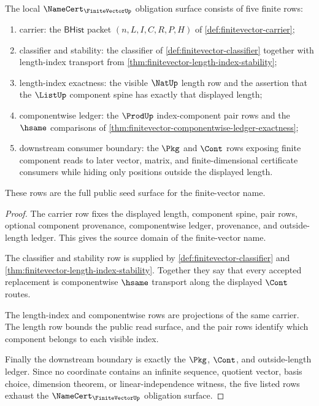 \begin{theorem}
\label{thm:finitevector-namecert-obligation-surface}
The local $\NameCert_{\FiniteVectorUp}$ obligation surface consists of five finite rows:
\begin{enumerate}
\item carrier: the $\mathsf{BHist}$ packet $(n,L,I,C,R,P,H)$ of \autoref{def:finitevector-carrier};
\item classifier and stability: the classifier of \autoref{def:finitevector-classifier} together with length-index transport from \autoref{thm:finitevector-length-index-stability};
\item length-index exactness: the visible $\NatUp$ length row and the assertion that the $\ListUp$ component spine has exactly that displayed length;
\item componentwise ledger: the $\ProdUp$ index-component pair rows and the $\hsame$ comparisons of \autoref{thm:finitevector-componentwise-ledger-exactness};
\item downstream consumer boundary: the $\Pkg$ and $\Cont$ rows exposing finite component reads to later vector, matrix, and finite-dimensional certificate consumers while hiding only positions outside the displayed length.
\end{enumerate}
These rows are the full public seed surface for the finite-vector name.
\end{theorem}
\begin{proof}
The carrier row fixes the displayed length, component spine, pair rows, optional component provenance, componentwise ledger, provenance, and outside-length ledger. This gives the source domain of the finite-vector name.

The classifier and stability row is supplied by \autoref{def:finitevector-classifier} and \autoref{thm:finitevector-length-index-stability}. Together they say that every accepted replacement is componentwise $\hsame$ transport along the displayed $\Cont$ routes.

The length-index and componentwise rows are projections of the same carrier. The length row bounds the public read surface, and the pair rows identify which component belongs to each visible index.

Finally the downstream boundary is exactly the $\Pkg$, $\Cont$, and outside-length ledger. Since no coordinate contains an infinite sequence, quotient vector, basis choice, dimension theorem, or linear-independence witness, the five listed rows exhaust the $\NameCert_{\FiniteVectorUp}$ obligation surface.
\end{proof}

